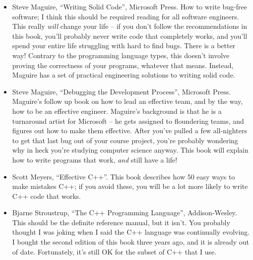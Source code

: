 \begin{itemize}
\item[] Steve Maguire, ``Writing Solid Code'', Microsoft Press.
How to write bug-free software; I think this should be required
reading for all software engineers.  This really {\em will} change
your life -- if you don't follow the recommendations in this book,
you'll probably never write code that completely works, and you'll
spend your entire life struggling with hard to find bugs.
There is a better way!  Contrary to the programming language types,
this doesn't involve proving the correctness of your programs, whatever
that means.  Instead, Maguire has a set of practical engineering
solutions to writing solid code.

\item[] Steve Maguire, ``Debugging the Development Process'', Microsoft Press.
Maguire's follow up book on how to lead an effective team, and
by the way, how to be an effective engineer.  Maguire's background is
that he is a turnaround artist for Microsoft -- he gets assigned to
floundering teams, and figures out how to make them effective.
After you've pulled a few all-nighters to get that last bug out
of your course project, you're probably wondering why in heck you're
studying computer science anyway.  This book will explain how
to write programs that work, {\em and} still have a life!

\item[] Scott Meyers, ``Effective C++''.  This book describes how
50 easy ways to make mistakes C++; if you avoid these, you will
be a lot more likely to write C++ code that works.

\item[] Bjarne Stroustrup, ``The C++ Programming Language'', Addison-Wesley.
This should be the definite reference manual, but it isn't.
You probably thought I was joking when I said the C++ language was
continually evolving.  I bought the second edition of this
book three years ago, and it is already out of date.
Fortunately, it's still OK for the subset of C++ that I use.
\end{itemize}



